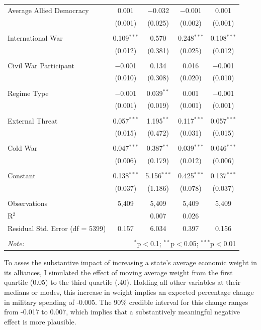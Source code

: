 \documentclass[12pt]{article}
\begin{document}
\begin{table}[!htbp]
\begin{tabular}{@{\extracolsep{5pt}}lcccc}
 Average Allied Democracy & 0.001 & $-$0.032 & $-$0.001 & 0.001 \\ 
  & (0.001) & (0.025) & (0.002) & (0.001) \\ 
  & & & & \\ 
 International War & 0.109$^{***}$ & 0.570 & 0.248$^{***}$ & 0.108$^{***}$ \\ 
  & (0.012) & (0.381) & (0.025) & (0.012) \\ 
  & & & & \\ 
 Civil War Participant & $-$0.001 & 0.134 & 0.016 & $-$0.001 \\ 
  & (0.010) & (0.308) & (0.020) & (0.010) \\ 
  & & & & \\ 
 Regime Type & $-$0.001 & 0.039$^{**}$ & 0.001 & $-$0.001 \\ 
  & (0.001) & (0.019) & (0.001) & (0.001) \\ 
  & & & & \\ 
 External Threat & 0.057$^{***}$ & 1.195$^{**}$ & 0.117$^{***}$ & 0.057$^{***}$ \\ 
  & (0.015) & (0.472) & (0.031) & (0.015) \\ 
  & & & & \\ 
 Cold War & 0.047$^{***}$ & 0.387$^{**}$ & 0.039$^{***}$ & 0.046$^{***}$ \\ 
  & (0.006) & (0.179) & (0.012) & (0.006) \\ 
  & & & & \\ 
 Constant & 0.138$^{***}$ & 5.156$^{***}$ & 0.425$^{***}$ & 0.137$^{***}$ \\ 
  & (0.037) & (1.186) & (0.078) & (0.037) \\ 
\hline \\[-1.8ex] 
Observations & 5,409 & 5,409 & 5,409 & 5,409 \\ 
R$^{2}$ &  & 0.007 & 0.026 &  \\  
Residual Std. Error (df = 5399) & 0.157 & 6.034 & 0.397 & 0.156 \\ 
\hline 
\hline \\[-1.8ex] 
\textit{Note:}  & \multicolumn{4}{r}{$^{*}$p$<$0.1; $^{**}$p$<$0.05; $^{***}$p$<$0.01} \\ 
\end{tabular} 
\end{table} 

To asses the substantive impact of increasing a state's average economic weight in its alliances, I simulated the effect of moving average weight from the first quartile (0.05) to the third quartile (.40). 
Holding all other variables at their medians or modes, this increase in weight implies an expected percentage change in military spending of -0.005. 
The 90\% credible interval for this change ranges from -0.017 to 0.007, which implies that a substantively meaningful negative effect is more plausible. 



\newpage
\singlespace


 
\end{document}
